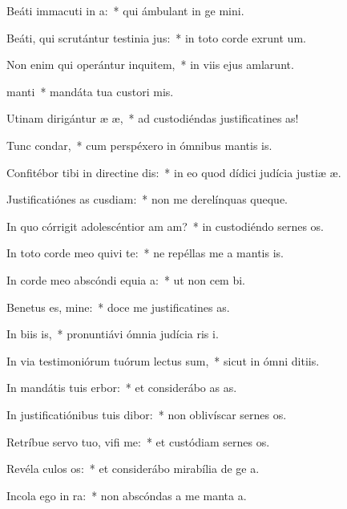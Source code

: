 \item Beáti immacuti in a:~* qui ámbulant in ge mini.
\item Beáti, qui scrutántur testinia jus:~* in toto corde exrunt um.
\item Non enim qui operántur inquitem,~* in viis ejus amlarunt.
\item {} manti~* mandáta tua custori mis.
\item Utinam dirigántur æ æ,~* ad custodiéndas justificatines as!
\item Tunc  condar,~* cum perspéxero in ómnibus mantis is.
\item Confitébor tibi in directine dis:~* in eo quod dídici judícia justiæ æ.
\item Justificatiónes as cusdiam:~* non me derelínquas queque.
\item In quo córrigit adolescéntior am am?~* in custodiéndo sernes os.
\item In toto corde meo quivi te:~* ne repéllas me a mantis is.
\item In corde meo abscóndi equia a:~* ut non cem bi.
\item Benetus es, mine:~* doce me justificatines as.
\item In biis is,~* pronuntiávi ómnia judícia ris i.
\item In via testimoniórum tuórum lectus sum,~* sicut in ómni ditiis.
\item In mandátis tuis erbor:~* et considerábo as as.
\item In justificatiónibus tuis dibor:~* non oblivíscar sernes os.
\item Retríbue servo tuo, vifi me:~* et custódiam sernes os.
\item Revéla culos os:~* et considerábo mirabília de ge a.
\item Incola ego  in ra:~* non abscóndas a me manta a.
